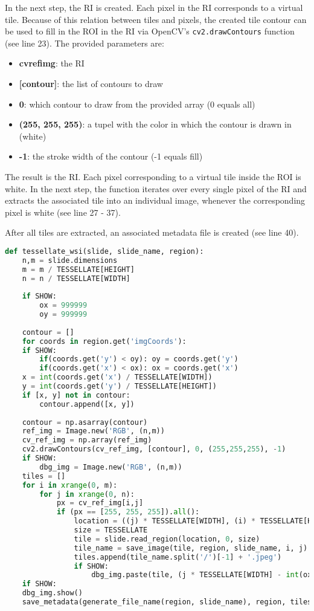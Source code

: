In the next step, the RI is created. Each pixel in the RI corresponds to a virtual tile. Because of this relation between tiles and pixels, the created tile contour can be used to fill in the ROI in the RI via OpenCV's \texttt{cv2.drawContours} function (see line 23). The provided parameters are:
\begin{itemize}
	\item \textbf{cv{\textunderscore}ref{\textunderscore}img}: the RI
	\item \textbf{[contour]}: the list of contours to draw
	\item \textbf{0}: which contour to draw from the provided array (0 equals all)
	\item \textbf{(255, 255, 255)}: a tupel with the color in which the contour is drawn in (white)
	\item \textbf{-1}: the stroke width of the contour (-1 equals fill)
\end{itemize}

The result is the RI. Each pixel corresponding to a virtual tile inside the ROI is white. In the next step, the function iterates over every single pixel of the RI and extracts the associated tile into an individual image, whenever the corresponding pixel is white (see line 27 - 37).

After all tiles are extracted, an associated metadata file is created (see line 40).

\begin{lstlisting}[frame=single,language=python]
def tessellate_wsi(slide, slide_name, region):
	n,m = slide.dimensions
	m = m / TESSELLATE[HEIGHT]
	n = n / TESSELLATE[WIDTH]
	
	if SHOW:
		ox = 999999
		oy = 999999
	
	contour = []
	for coords in region.get('imgCoords'):
	if SHOW:
		if(coords.get('y') < oy): oy = coords.get('y')
		if(coords.get('x') < ox): ox = coords.get('x')
	x = int(coords.get('x') / TESSELLATE[WIDTH])
	y = int(coords.get('y') / TESSELLATE[HEIGHT])
	if [x, y] not in contour:
		contour.append([x, y])
	
	contour = np.asarray(contour)
	ref_img = Image.new('RGB', (n,m))
	cv_ref_img = np.array(ref_img)
	cv2.drawContours(cv_ref_img, [contour], 0, (255,255,255), -1)
	if SHOW:
		dbg_img = Image.new('RGB', (n,m))
	tiles = []
	for i in xrange(0, m):
		for j in xrange(0, n):
			px = cv_ref_img[i,j]
			if (px == [255, 255, 255]).all():
				location = ((j) * TESSELLATE[WIDTH], (i) * TESSELLATE[HEIGHT])
				size = TESSELLATE
				tile = slide.read_region(location, 0, size)
				tile_name = save_image(tile, region, slide_name, i, j)
				tiles.append(tile_name.split('/')[-1] + '.jpeg')
				if SHOW:
					dbg_img.paste(tile, (j * TESSELLATE[WIDTH] - int(ox), i * TESSELLATE[HEIGHT] - int(oy)))
	if SHOW:
	dbg_img.show()
	save_metadata(generate_file_name(region, slide_name), region, tiles)
\end{lstlisting}
\clearpage


